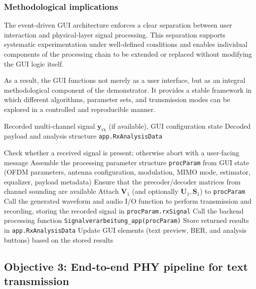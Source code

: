 \subsubsection{Methodological implications}
\label{sec:gui_method_implications}

The event-driven GUI architecture enforces a clear separation between user interaction and physical-layer signal processing. This separation supports systematic experimentation under well-defined conditions and enables individual components of the processing chain to be extended or replaced without modifying the GUI logic itself.

As a result, the GUI functions not merely as a user interface, but as an integral methodological component of the demonstrator. It provides a stable framework in which different algorithms, parameter sets, and transmission modes can be explored in a controlled and reproducible manner.

\begin{algorithm}[t]
\caption{GUI-driven execution flow for receiver processing}
\label{alg:gui_execution}
\begin{algorithmic}[1]
\Require Recorded multi-channel signal $\mathbf{y}_{\mathrm{rx}}$ (if available), GUI configuration state
\Ensure Decoded payload and analysis structure \texttt{app.RxAnalysisData}

\State Check whether a received signal is present; otherwise abort with a user-facing message
\State Assemble the processing parameter structure \texttt{procParam} from GUI state
\Statex \hspace{1em} (OFDM parameters, antenna configuration, modulation, MIMO mode, estimator, equalizer, payload metadata)
    \State Ensure that the precoder/decoder matrices from channel sounding are available
    \State Attach $\mathbf{V}_1$ (and optionally $\mathbf{U}_1,\mathbf{S}_1$) to \texttt{procParam}
\EndIf
\State Call the generated waveform and audio I/O function to perform transmission and recording, storing the recorded signal in \texttt{procParam.rxSignal}
\State Call the backend processing function \texttt{Signalverarbeitung\_app(procParam)}
\State Store returned results in \texttt{app.RxAnalysisData}
\State Update GUI elements (text preview, BER, and analysis buttons) based on the stored results
\end{algorithmic}
\end{algorithm}

\subsection{Objective 3: End-to-end PHY pipeline for text transmission}
\label{sec:algorithmic_design}

